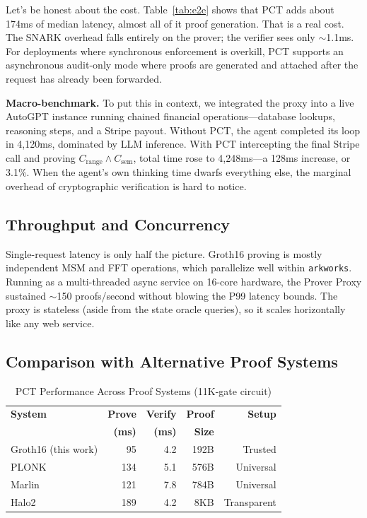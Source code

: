 \documentclass[10pt,conference]{IEEEtran}
\begin{document}
Let's be honest about the cost. Table~\ref{tab:e2e} shows that PCT adds about 174ms of median latency, almost all of it proof generation. That is a real cost. The SNARK overhead falls entirely on the prover; the verifier sees only $\sim$1.1ms. For deployments where synchronous enforcement is overkill, PCT supports an asynchronous audit-only mode where proofs are generated and attached after the request has already been forwarded.

\textbf{Macro-benchmark.} To put this in context, we integrated the proxy into a live AutoGPT instance running chained financial operations---database lookups, reasoning steps, and a Stripe payout. Without PCT, the agent completed its loop in 4,120ms, dominated by LLM inference. With PCT intercepting the final Stripe call and proving $C_{\text{range}} \wedge C_{\text{sem}}$, total time rose to 4,248ms---a 128ms increase, or 3.1\%. When the agent's own thinking time dwarfs everything else, the marginal overhead of cryptographic verification is hard to notice.

\subsection{Throughput and Concurrency}

Single-request latency is only half the picture. Groth16 proving is mostly independent MSM and FFT operations, which parallelize well within \texttt{arkworks}. Running as a multi-threaded async service on 16-core hardware, the Prover Proxy sustained $\sim$150 proofs/second without blowing the P99 latency bounds. The proxy is stateless (aside from the state oracle queries), so it scales horizontally like any web service.

\subsection{Comparison with Alternative Proof Systems}

\begin{table}[t]
\centering
\caption{PCT Performance Across Proof Systems (11K-gate circuit)}
\label{tab:systems}
\begin{tabular}{@{}lrrrr@{}}
\toprule
\textbf{System} & \textbf{Prove} & \textbf{Verify} & \textbf{Proof} & \textbf{Setup} \\
 & \textbf{(ms)} & \textbf{(ms)} & \textbf{Size} & \\
\midrule
Groth16 (this work) & 95 & 4.2 & 192B & Trusted \\
PLONK & 134 & 5.1 & 576B & Universal \\
Marlin & 121 & 7.8 & 784B & Universal \\
Halo2 & 189 & 4.2 & 8KB & Transparent \\
\bottomrule
\end{tabular}
\end{table}
\end{document}
